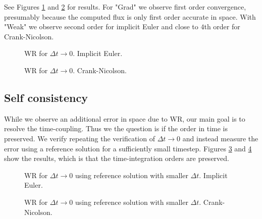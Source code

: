 \documentclass[a4paper,10pt]{article}
\begin{document}
See Figures \ref{FIG WR DX 1} and \ref{FIG WR DX 2} for results. For "Grad" we observe first order convergence, presumably because the computed flux is only first order accurate in space. With "Weak" we observe second order for implicit Euler and close to $4$th order for Crank-Nicolson.

\begin{figure}[ht!]
\caption{WR for $\Delta t \rightarrow 0$. Implicit Euler.}
\label{FIG WR DX 1}
\end{figure}
% 
\begin{figure}[ht!]
\caption{WR for $\Delta t \rightarrow 0$. Crank-Nicolson.}
\label{FIG WR DX 2}
\end{figure}
% 
\FloatBarrier
\subsection{Self consistency}
While we observe an additional error in space due to WR, our main goal is to resolve the time-coupling. Thus we the question is if the order in time is preserved. We verify repeating the verification of $\Delta t \rightarrow 0$ and instead measure the error using a reference solution for a sufficiently small timestep. Figures \ref{FIG WR CONS 1} and \ref{FIG WR CONS 2} show the results, which is that the time-integration orders are preserved.

\begin{figure}[ht!]
\caption{WR for $\Delta t \rightarrow 0$ using reference solution with smaller $\Delta t$. Implicit Euler.}
\label{FIG WR CONS 1}
\end{figure}
% 
\begin{figure}[ht!]
\caption{WR for $\Delta t \rightarrow 0$ using reference solution with smaller $\Delta t$. Crank-Nicolson.}
\label{FIG WR CONS 2}
\end{figure}
% 
\FloatBarrier
\end{document}
